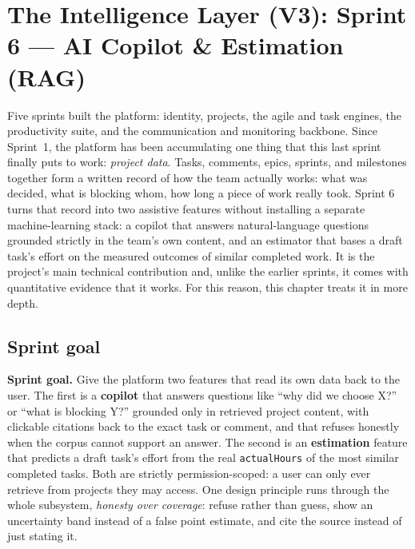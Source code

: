 \chapter{The Intelligence Layer (V3): Sprint 6 --- AI Copilot \& Estimation (RAG)}

Five sprints built the platform: identity, projects, the agile and task engines, the productivity suite, and
the communication and monitoring backbone. Since Sprint~1, the platform has been accumulating one thing that
this last sprint finally puts to work: \emph{project data}. Tasks, comments, epics, sprints, and milestones
together form a written record of how the team actually works: what was decided, what is blocking whom, how
long a piece of work really took. Sprint 6 turns that record into two assistive features without installing a
separate machine-learning stack: a copilot that answers natural-language questions grounded strictly in the
team's own content, and an estimator that bases a draft task's effort on the measured outcomes of similar
completed work. It is the project's main technical contribution and, unlike the earlier sprints, it comes
with quantitative evidence that it works. For this reason, this chapter treats it in more depth.

\section{Sprint goal}

\textbf{Sprint goal.} Give the platform two features that read its own data back to the user. The first is a
\textbf{copilot} that answers questions like ``why did we choose X?'' or ``what is blocking Y?'' grounded only in
retrieved project content, with clickable citations back to the exact task or comment, and that refuses
honestly when the corpus cannot support an answer. The second is an \textbf{estimation} feature that predicts a
draft task's effort from the real \texttt{actualHours} of the most similar completed tasks. Both are strictly
permission-scoped: a user can only ever retrieve from projects they may access. One design principle runs
through the whole subsystem, \emph{honesty over coverage}: refuse rather than guess, show an uncertainty band
instead of a false point estimate, and cite the source instead of just stating it.


